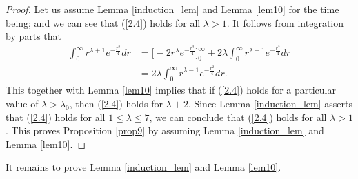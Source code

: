 \documentclass{amsart}
\theoremstyle{Corollary}
\numberwithin{equation}{section}
\begin{document}
\begin{proof}
Let us assume Lemma \ref{induction_lem} and Lemma \ref{lem10} for the time being;
and we can see that (\ref{2.4}) holds for all $\lambda>1$.
It follows from integration by parts that
\begin{equation*}
\begin{split}
\int_0^\infty r^{\lambda+1} e^{-\frac{r^2}{4}}dr
&=\Big[-2r^{\lambda}e^{-\frac{r^2}{4}}\Big]_0^\infty+2\lambda\int_0^\infty r^{\lambda-1} e^{-\frac{r^2}{4}}dr\\
&=2\lambda\int_0^\infty r^{\lambda-1} e^{-\frac{r^2}{4}}dr.
\end{split}
\end{equation*}
This together with Lemma \ref{lem10} implies that
if (\ref{2.4}) holds for a particular value of $\lambda>\lambda_0$, then
(\ref{2.4}) holds for $\lambda+2$.
Since Lemma \ref{induction_lem} asserts that (\ref{2.4}) holds for all $1\leq \lambda\leq 7$,
we can conclude that  (\ref{2.4}) holds for all $\lambda>1$.
This proves Proposition \ref{prop9} by assuming Lemma \ref{induction_lem} and Lemma \ref{lem10}.
\end{proof}


It remains to prove Lemma \ref{induction_lem} and Lemma \ref{lem10}.
\end{document}
